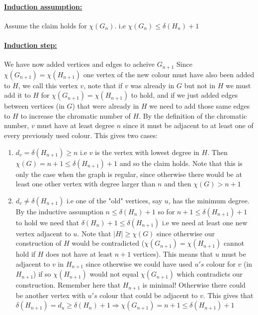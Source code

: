 \documentclass{article}
\begin{document}
\paragraph{\underline{Induction assumption:}} Assume the claim holds for $\chi(G_{n})$. i.e $\chi(G_{n}) \leq \delta(H_{n}) + 1$

\paragraph{\underline{Induction step:}} We have now added vertices and edges to acheive $G_{n+1}$ Since $\chi(G_{n+1}) = \chi(H_{n+1})$ one vertex of the new colour must have also been added to $H$, we call this vertex $v$, note that if $v$ was already in $G$ but not in $H$ we must add it to $H$ for $\chi(G_{n+1}) = \chi(H_{n+1})$ to hold, and if we just added edges between vertices (in $G$) that were already in $H$ we need to add those same edges to $H$ to increase the chromatic number of $H$. By the definition of the chromatic number, $v$ must have at least degree $n$ since it must be adjacent to at least one of every previously used colour. This gives two cases:
\begin{enumerate}
    \item $d_{v} = \delta(H_{n+1}) \geq n$ i.e $v$ is the vertex with lowest degree in $H$. Then $\chi(G) = n+1 \leq \delta(H_{n+1}) + 1$ and so the claim holds. Note that this is only the case when the graph is regular, since otherwise there would be at least one other vertex with degree larger than $n$ and then $\chi(G) > n+1$
    
    \item $d_{v} \neq \delta(H_{n+1})$ i.e one of the "old" vertices, say $u$, has the minimum degree. By the inductive assumption $n \leq \delta(H_{n}) + 1$ so for $n+1 \leq \delta(H_{n+1}) +1$ to hold we need that $\delta(H_{n}) + 1 \leq \delta(H_{n+1})$ i.e we need at least one new vertex adjacent to $u$. Note that $| H | \geq \chi(G)$ since otherwise our construction of $H$ would be contradicted ($\chi(G_{n+1}) = \chi(H_{n+1})$ cannot hold if $H$ does not have at least $n+1$ vertices). This means that $u$ must be adjacent to $v$ in $H_{n+1}$ since otherwise we could have used $u's$ colour for $v$ (in $H_{n+1}$) if so $\chi(H_{n+1}) $ would not equal $ \chi(G_{n+1})$ which contradicts our construction. Remember here that $H_{n+1}$ is minimal! Otherwise there could be another vertex with $u's$ colour that could be adjacent to $v$. This gives that $\delta(H_{n+1}) = d_{u} \geq \delta(H_{n}) +1  \Rightarrow  \chi(G_{n+1}) = n+1 \leq \delta(H_{n+1}) +1$
\end{enumerate}
\end{document}
